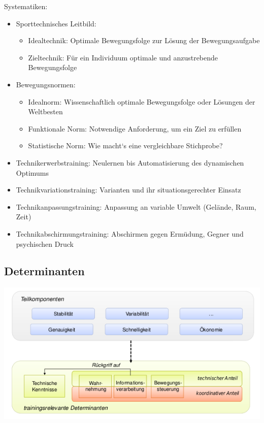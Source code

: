 Systematiken:
\begin{itemize}
    \item Sporttechnisches Leitbild:
    \begin{itemize}
        \item Idealtechnik: Optimale Bewegungsfolge zur Lösung der Bewegungsaufgabe
        \item Zieltechnik: Für ein Individuum optimale und anzustrebende Bewegungsfolge
    \end{itemize}
    \item Bewegungsnormen:
    \begin{itemize}
        \item Idealnorm: Wissenschaftlich optimale Bewegungsfolge oder Lösungen der Weltbesten
        \item Funktionale Norm: Notwendige Anforderung, um ein Ziel zu erfüllen
        \item Statistische Norm: Wie macht‘s eine vergleichbare Stichprobe?
    \end{itemize}
    \item Technikerwerbstraining: Neulernen bis Automatisierung des dynamischen Optimums
    \item Technikvariationstraining: Varianten und ihr situationsgerechter Einsatz
    \item Technikanpassungstraining: Anpassung an variable Umwelt (Gelände, Raum, Zeit)
    \item Technikabschirmungstraining: Abschirmen gegen  Ermüdung, Gegner und psychischen Druck
\end{itemize}

\subsection{Determinanten}

\includegraphics[width=\textwidth]{pictures/tech_determinanten}

